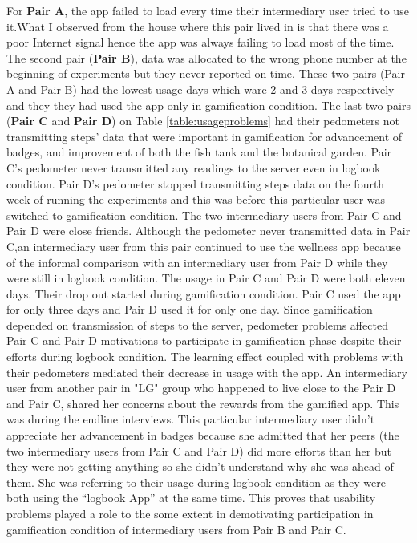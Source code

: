 \newline 
For \textbf{Pair A}, the app failed to load every time their intermediary user tried to use it.What I observed from the house where this pair lived in is that there was a poor Internet signal hence the app was always failing to load most of the time. The second pair (\textbf{Pair B}), data was allocated to the wrong phone number at the beginning of experiments but they never reported on time. These two pairs (Pair A and Pair B) had the lowest usage days which ware 2 and 3 days respectively and they they had used the app only in gamification condition. The last two pairs (\textbf{Pair C} and \textbf{Pair D}) on Table \ref{table:usageproblems} had their pedometers not transmitting steps' data that were important in gamification for advancement of badges, and improvement of both the fish tank and the botanical garden. Pair C's pedometer never transmitted any readings to the server even in logbook condition.  Pair D's pedometer stopped transmitting steps data on the fourth week of running the experiments and this was before this particular user was switched to gamification condition. The two intermediary users from Pair C and Pair D were close friends. Although the pedometer never transmitted data in Pair C,an intermediary user from this pair continued to use the wellness app because of the informal comparison with an intermediary user from Pair D while they were still in logbook condition. The usage in Pair C and Pair D were both eleven days. Their drop out started during gamification condition. Pair C used the app for only three days and Pair D used it for only one day. Since gamification depended on transmission of steps to the server, pedometer problems affected Pair C and Pair D motivations to participate in gamification phase despite their efforts during logbook condition. The learning effect coupled with problems with their pedometers mediated their decrease in usage with the app.  An intermediary user from another pair in "LG" group who happened to live close to the Pair D and Pair C, shared her concerns about the rewards from the gamified app. This was during the endline interviews. This particular intermediary user didn't appreciate her advancement in badges because she admitted that her peers (the two intermediary users from Pair C and Pair D) did more efforts than her but they were not getting anything so she didn't understand why she was ahead of them. She was referring to their usage during logbook condition as they were both using the ``logbook App'' at the same time.  This proves that usability problems played a role to the some extent in demotivating participation in gamification condition  of intermediary users from Pair B and Pair C.\newline
